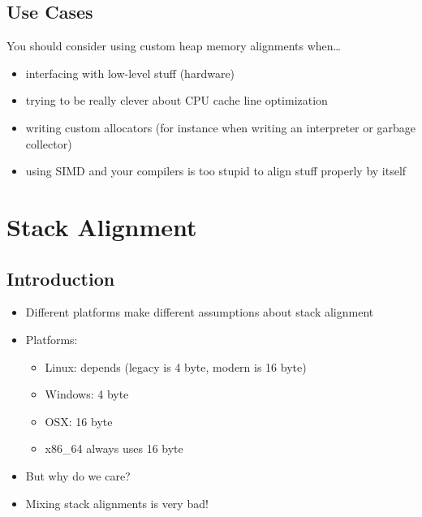 \documentclass{beamer}
\begin{document}
\subsection{Use Cases}
\begin{frame}{\insertsection}{\insertsubsection}
    You should consider using custom heap memory alignments when\ldots\pause
    \begin{itemize}
        \item interfacing with low-level stuff (hardware)\pause
        \item trying to be really clever about CPU cache line optimization\pause
        \item writing custom allocators (for instance when writing an interpreter or garbage
            collector)\pause
        \item using SIMD and your compilers is too stupid to align stuff properly by itself
    \end{itemize}
\end{frame}

\section{Stack Alignment}
\subsection{Introduction}
\begin{frame}{\insertsection}{\insertsubsection}
    \begin{itemize}
        \item Different platforms make different assumptions about stack alignment
        \item Platforms:
            \begin{itemize}
                \item Linux: depends (legacy is 4 byte, modern is 16 byte)
                \item Windows: 4 byte
                \item OSX: 16 byte
                \item x86\_64 always uses 16 byte
            \end{itemize}
            \pause
        \item But why do we care? \pause
        \item Mixing stack alignments is very bad!
    \end{itemize}
\end{frame}
\end{document}
